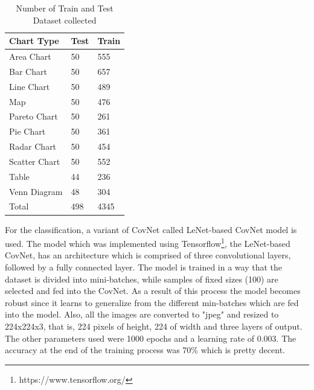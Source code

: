 \documentclass[12pt, a4paper,oneside]{report}
\begin{document}
\begin{table}[h]
	\centering {} \small
	\begin{tabular}{|p{5cm}|p{3cm}|p{3cm}|}
		\hline
		Chart Type & Test & Train \\ \hline
		Area Chart & 50 & 555 \\ \hline
		Bar Chart & 50 & 657 \\ \hline
		Line Chart & 50 & 489 \\ \hline
		Map & 50 & 476 \\ \hline
		Pareto Chart & 50 & 261 \\ \hline	
		Pie Chart & 50 & 361 \\ \hline
		Radar Chart & 50 & 454 \\ \hline
		Scatter Chart & 50 & 552 \\ \hline
		Table & 44 & 236 \\ \hline
		Venn Diagram & 48 & 304 \\ \hline
		Total & 498 & 4345 \\ \hline
		
	\end{tabular}
	\caption {Number of Train and Test Dataset collected}	
	\label{table:rela}
\end{table}

For the classification, a variant of CovNet called LeNet-based CovNet model is used. The model which was implemented using Tensorflow\footnote{https://www.tensorflow.org/}, the LeNet-based CovNet, has an architecture which is comprised of three convolutional layers, followed by a fully connected layer. The model is trained in a way that the dataset is divided into mini-batches, while samples of fixed sizes (100) are selected and fed into the CovNet. As a result of this process the model becomes robust since it learns to generalize from the different min-batches which are fed into the model. Also, all the images are converted to "jpeg" and resized to 224x224x3, that is, 224 pixels of height, 224 of width and three layers of output. The other parameters used were 1000 epochs and a learning rate of 0.003. The accuracy at the end of the training process was 70\% which is pretty decent.
\end{document}

